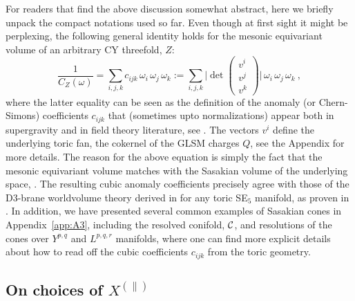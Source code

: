 \documentclass[11pt,a4paper]{article}
\def\cC{{\cal C}}
\theoremstyle{definition}
\theoremstyle{identity}
\theoremstyle{remark}
\newcommand{\be}{\begin{equation}}
\newcommand{\ee}{\end{equation}}
\begin{document}
For readers that find the above discussion somewhat abstract, here we briefly unpack the compact notations used so far. Even though at first sight it might be perplexing, the following general identity holds for the mesonic equivariant volume of an arbitrary CY threefold, $Z$:
\be
\label{eq:cubiccoeff}
    \frac1{C_Z (\omega)} = \sum_{i, j, k} c_{i j k}\, \omega_i\, \omega_j\, \omega_k := \sum_{i, j, k} \Big| \det \begin{pmatrix} v^i \\ v^j \\v^k \end{pmatrix} \Big|\, \omega_i\, \omega_j\, \omega_k\ ,  
\ee
where the latter equality can be seen as the definition of the anomaly (or Chern-Simons) coefficients $c_{i j k}$ that (sometimes upto normalizations) appear both in supergravity and in field theory literature, see \cite{Witten:1998qj,Tachikawa:2005tq,Hristov:2025ygn}. The vectors $v^i$ define the underlying toric fan, the cokernel of the GLSM charges $Q$, see the Appendix for more details. The reason for the above equation is simply the fact that the mesonic equivariant volume matches with the Sasakian volume of the underlying space, \cite{Martelli:2005tp,Martelli:2006yb,Martelli:2023oqk}. The resulting cubic anomaly coefficients precisely agree with those of the D3-brane worldvolume theory derived in \cite{Benvenuti:2006xg} for any toric SE$_5$ manifold, as proven in \cite{Butti:2005vn,Lee:2006ru}. In addition, we have presented several common examples of Sasakian cones in Appendix\ \ref{app:A3}, including the resolved conifold, $\cC$, and resolutions of the cones over $Y^{p,q}$ and $L^{p,q,r}$ manifolds, where one can find more explicit details about how to read off the cubic coefficients $c_{i j k}$ from the toric geometry.

\subsection*{On choices of $X^{(\parallel)}$}
\end{document}
